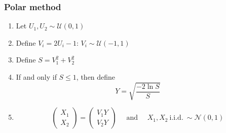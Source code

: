 \documentclass[10pt, serif, mathserif]{beamer}
\begin{document}
\begin{frame}
  \frametitle{Polar method}
  \begin{enumerate}
    \item Let $U_1, U_2 \sim \mathcal{U}(0,1)$
    \item Define $V_i = 2U_i - 1$: $V_i \sim \mathcal{U}(-1,1)$
    \item Define $S = V_1^2 + V_2^2$
    \item If and only if $S \leq 1$, then define
      \[ Y = \sqrt{\frac{-2\ln{S}}{S}} \]
    \item \[
        \left( \begin{matrix} X_1 \\ X_2 \end{matrix} \right) = \left( \begin{matrix} V_1 Y \\ V_2 Y \end{matrix} \right)
        \quad \text{ and } \quad X_1,X_2\ \text{i.i.d.}\ \sim \mathcal{N}(0,1)
      \]
  \end{enumerate}  

\end{frame}
\end{document}
